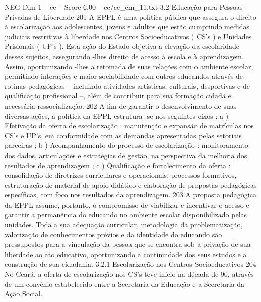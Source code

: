 \begin{textsample}{NEG Dim 1 – ce – Score 6.00 – ce/ce\_em\_11.txt}  \label{ex:f1_neg_247}
3.2 Educação para Pessoas Privadas de Liberdade 201 A EPPL é uma política pública que assegura o direito à escolarização aos adolescentes, jovens e adultos que estão cumprindo medidas judiciais restritivas à liberdade nos Centros Socioeducativos ( CS’s ) e Unidades Prisionais ( UP’s ).
Esta ação do Estado objetiva a elevação da escolaridade desses sujeitos, assegurando -lhes direito de acesso à escola e à aprendizagem.
Assim, oportunizando -lhes a retomada de suas relações com o ambiente escolar, permitindo interações e maior sociabilidade com outros educandos através de rotinas pedagógicas – incluindo atividades artísticas, culturais, desportivas e de qualificação profissional –, além de contribuir para sua formação cidadã e necessária ressocialização. 202 A fim de garantir o desenvolvimento de suas diversas ações, a política da EPPL estrutura -se nos seguintes eixos : a ) Efetivação da oferta de escolarização : manutenção e expansão de matrículas nos CS’s e UP’s, em conformidade com as demandas apresentadas pelas setoriais parceiras ; b ) Acompanhamento do processo de escolarização : monitoramento dos dados, articulações e estratégias de gestão, na perspectiva da melhoria dos resultados de aprendizagem ; c ) Qualificação e fortalecimento da oferta : consolidação de diretrizes curriculares e operacionais, processos formativos, estruturação de material de apoio didático e elaboração de propostas pedagógicas específicas, com foco nos resultados da aprendizagem. 203 A proposta pedagógica da EPPL assume, portanto, o compromisso de viabilizar e incentivar o acesso e garantir a permanência do educando no ambiente escolar disponibilizado pelas unidades.
Toda a sua adequação curricular, metodologia da problematização, valorização de conhecimentos prévios e da identidade do educando são pressupostos para a vinculação da pessoa que se encontra sob a privação de sua liberdade ao ato educativo, oportunizando a continuidade dos seus estudos e a construção de sua cidadania. 3.2.1 Escolarização nos Centros Socioeducativos 204 No Ceará, a oferta de escolarização nos CS’s teve início na década de 90, através de um convênio estabelecido entre a Secretaria da Educação e a Secretaria da Ação Social.

\end{textsample}

